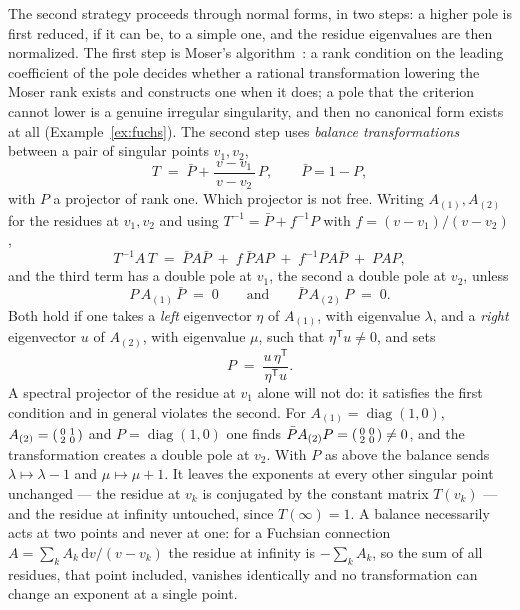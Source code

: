 \documentclass[11pt]{article}
\newcommand{\dd}{\mathrm{d}}
\begin{document}
The second strategy proceeds through normal forms, in two steps: a
higher pole is first reduced, if it can be, to a simple one, and the
residue eigenvalues are then normalized.  The first step is Moser's
algorithm~\cite{moser}: a rank condition on the leading coefficient of
the pole
decides whether a rational transformation lowering the Moser rank
exists and constructs one when it does; a pole that the criterion
cannot lower is a genuine irregular singularity, and then no
canonical form exists at all (Example~\ref{ex:fuchs}).  The second
step uses \emph{balance transformations} between a pair of singular
points $v_1, v_2$,
\begin{equation}
  T \;=\; \bar P + \frac{v - v_1}{\,v - v_2\,}\, P ,
  \qquad \bar P = 1 - P ,
  \label{eq:balance}
\end{equation}
with $P$ a projector of rank one.  Which projector is not free.
Writing $A_{(1)}, A_{(2)}$ for the residues at $v_1, v_2$ and using
$T^{-1} = \bar P + f^{-1}P$ with $f = (v-v_1)/(v-v_2)$,
\begin{equation}
  T^{-1}A\,T \;=\;
  \bar P A \bar P \;+\; f\,\bar P A P
  \;+\; f^{-1} P A \bar P \;+\; P A P ,
\end{equation}
and the third term has a double pole at $v_1$, the second a double
pole at $v_2$, unless
\begin{equation}
  P\,A_{(1)}\,\bar P \;=\; 0
  \qquad\text{and}\qquad
  \bar P\,A_{(2)}\,P \;=\; 0 .
  \label{eq:balanceconditions}
\end{equation}
Both hold if one takes a \emph{left} eigenvector $\eta$ of $A_{(1)}$,
with eigenvalue $\lambda$, and a \emph{right} eigenvector $u$ of
$A_{(2)}$, with eigenvalue $\mu$, such that $\eta^{\mathsf T}u \ne 0$,
and sets
\begin{equation}
  P \;=\; \frac{u\,\eta^{\mathsf T}}{\eta^{\mathsf T}u} .
\end{equation}
A spectral projector of the residue at $v_1$ alone will not do: it
satisfies the first condition and in general violates the second.
For $A_{(1)} = \operatorname{diag}(1,0)$,
$A_{(2)} = \begin{psmallmatrix} 0 & 1\\ 2 & 0\end{psmallmatrix}$ and
$P = \operatorname{diag}(1,0)$ one finds
$\bar P A_{(2)} P = \begin{psmallmatrix} 0&0\\ 2&0\end{psmallmatrix}
\neq 0$, and the transformation creates a double pole at $v_2$.  With
$P$ as above the balance sends $\lambda \mapsto \lambda - 1$ and
$\mu \mapsto \mu + 1$.  It leaves the exponents at every other
singular point unchanged --- the residue at $v_k$ is conjugated by the
constant matrix $T(v_k)$ --- and the residue at infinity untouched,
since $T(\infty) = 1$.  A balance necessarily acts at two points and
never at one: for a Fuchsian connection
$A = \sum_k A_k\,\dd v/(v-v_k)$ the residue at infinity is
$-\sum_k A_k$, so the sum of all residues, that point included,
vanishes identically and no transformation can change an exponent at
a single point.
\end{document}
